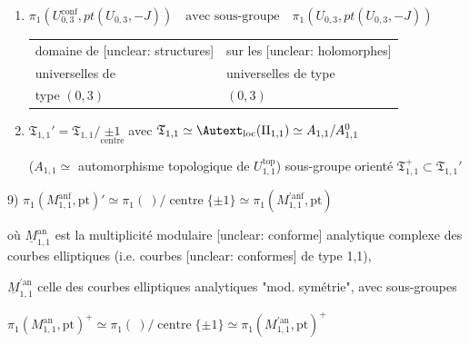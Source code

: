 \begin{enumerate}
    (avec sous-groupe des triangles orientés
    
    $$ \Gamma_{0,3} = \{ \rho_0, \rho_1, \rho_\infty \mid \rho_\infty\rho_1\rho_0 = \rho_0^2 = \rho_1^3 = 1 \} \quad ) $$
    \vspace{-0.5cm}
    $$ \hspace{2cm} \underset{\tau_1\tau_\infty}{\uparrow} \hspace{0.3cm} \underset{\tau_\infty\tau_0}{\uparrow} \hspace{0.3cm} \underset{\tau_0\tau_1}{\uparrow} $$

    \item[7)] $\pi_1( U_{0,3}^{\mathrm{conf}}, pt(U_{0,3}, -J) ) \quad \text{avec sous-groupe} \quad \pi_1( U_{0,3}, pt(U_{0,3}, -J) )$
    
    \begin{tabular}{ll}
    domaine de [unclear: structures] & sur les [unclear: holomorphes] \\
    universelles de & universelles de type \\
    type $(0,3)$ & $(0,3)$
    \end{tabular}

    \item[8)] $\mathfrak{T}_{1,1}' = \mathfrak{T}_{1,1} / \underset{\text{centre}}{\pm 1}$ \quad avec \quad $\mathfrak{T}_{1,1} \simeq \Autext_{\mathrm{loc}}(\Pi_{1,1}) \simeq A_{1,1} / A_{1,1}^0$
    
    ($A_{1,1} \simeq$ automorphisme topologique de $U_{1,1}^{\mathrm{top}}$) sous-groupe orienté $\mathfrak{T}_{1,1}^+ \subset \mathfrak{T}_{1,1}'$
\end{enumerate}

\newpage


9) $\pi_1(M_{1,1}^{\text{anf}}, \text{pt})' \simeq \pi_1(\ )/\operatorname{centre}\{\pm 1\} \simeq \pi_1(M_{1,1}^{\prime \text{anf}}, \text{pt})$

où $\underline{M}_{1,1}^{\text{an}}$ est la multiplicité modulaire [unclear: conforme] analytique complexe des courbes elliptiques (i.e. courbes [unclear: conformes] de type 1,1),

$\underline{M}_{1,1}^{\prime \text{an}}$ celle des courbes elliptiques analytiques "mod. symétrie", avec sous-groupes

$\pi_1(M_{1,1}^{\text{an}}, \text{pt})^+ \simeq \pi_1(\ )/\operatorname{centre}\{\pm 1\} \simeq \pi_1(M_{1,1}^{\prime \text{an}}, \text{pt})^+$

